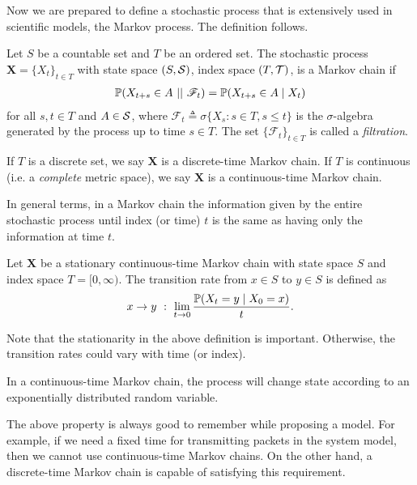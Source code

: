 Now we are prepared to define a stochastic process that is extensively used in scientific models, the Markov process. The definition follows.
%
\begin{definition} \label{def:markov_chain}
    Let $S$ be a countable set and $T$ be an ordered set. The stochastic process $\bm{X}=\{X_t\}_{t\in T}$ with state space $(S,\cal S)$, index space $(T,\cal T)$, is a Markov chain if \vspace{-5mm}
    \begin{align*}
        \P(X_{t+s}\in A ~||~ \mathscr{F}_t) = \P(X_{t+s}\in A\mid X_t)
    \end{align*}
    for all $s,t\in T$ and $A\in\cal{S}$, where $\mathscr{F}_t \triangleq \sigma\{X_s : s\in T, s \le t\}$ is the $\sigma$-algebra generated by the process up to time $s\in T$. The set $\{\mathscr{F}_t\}_{t\in T}$ is called a \textit{filtration}.
    
    If $T$ is a discrete set, we say $\bm{X}$ is a discrete-time Markov chain.
    If $T$ is continuous (i.e. a \textit{complete} metric space), we say $\bm{X}$ is a continuous-time Markov chain.
\end{definition}

In general terms, in a Markov chain the information given by the entire stochastic process until index (or time) $t$ is the same as having only the information at time $t$.

\begin{definition} \label{def:transition-rate}
    Let $\bm{X}$ be a stationary continuous-time Markov chain with state space $S$ and index space $T = [0,\infty)$.
    The transition rate from $x\in S$ to $y\in S$ is defined as
    \begin{align*}
        x\to y ~:~ \lim_{t\to 0}\frac{\P(X_t=y \mid X_0 = x)}{t}.
    \end{align*}
\end{definition}

Note that the stationarity in the above definition is important. Otherwise, the transition rates could vary with time (or index).

\begin{theorem}
    In a continuous-time Markov chain, the process will change state according to an exponentially distributed random variable.
\end{theorem}

The above property is always good to remember while proposing a model.
%
For example, if we need a fixed time for transmitting packets in the system model, then we cannot use continuous-time Markov chains.
%
On the other hand, a discrete-time Markov chain is capable of satisfying this requirement.

